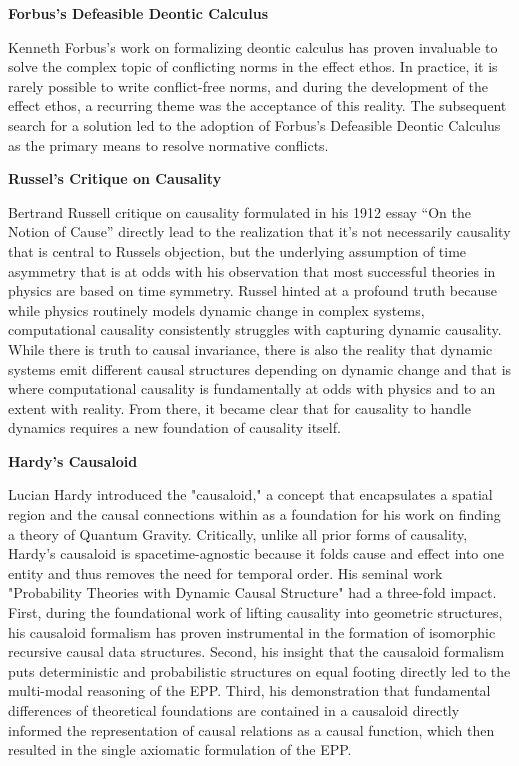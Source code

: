 \textbf{Forbus's Defeasible Deontic Calculus}

Kenneth Forbus's work on formalizing deontic calculus \cite{olson2024DDIC} has proven invaluable to solve the complex topic of conflicting norms in the effect ethos. In practice, it is rarely possible to write conflict-free norms, and during the development of the effect ethos, a recurring theme was the acceptance of this reality. The subsequent search for a solution led to the adoption of Forbus's Defeasible Deontic Calculus as the primary means to resolve normative conflicts.

\textbf{Russel's Critique on Causality}

Bertrand Russell critique on causality  formulated in his 1912 essay ``On the Notion of Cause''\cite{RussellOnCause} directly lead to the realization that it's not necessarily causality that is central to Russels objection, but the underlying assumption of time asymmetry that is at odds with his observation that most successful theories in physics are based on time symmetry. Russel hinted at a profound truth because while physics routinely models dynamic change in complex systems, computational causality consistently struggles with capturing dynamic causality.  While there is truth to causal invariance, there is also the reality that dynamic systems emit different causal structures depending on dynamic change and that is where computational causality is fundamentally at odds with physics and to an extent with reality. From there, it became clear that for causality to handle dynamics requires a new foundation of causality itself.

\textbf{Hardy's Causaloid}

Lucian Hardy introduced the "causaloid,"\cite{HardyDynamicCausalStructure} a concept that encapsulates a spatial region and the causal connections within 
as a foundation for his work on finding a theory of Quantum Gravity. Critically, unlike all prior forms of causality, 
Hardy's causaloid is spacetime-agnostic because it folds cause and effect into one entity and thus removes the need for temporal order. His seminal work "Probability Theories with Dynamic Causal Structure" \cite{hardy2005probability} had a three-fold impact.
First, during the foundational work of lifting causality into geometric structures, his causaloid formalism has
proven instrumental in the formation of isomorphic recursive causal data structures. 
Second, his insight that the causaloid formalism puts deterministic and probabilistic structures on equal footing directly led to the multi-modal reasoning of the EPP. 
Third, his demonstration that fundamental differences of theoretical foundations are contained in a causaloid directly informed the representation of causal relations 
as a causal function, which then resulted in the single axiomatic formulation of the EPP.

